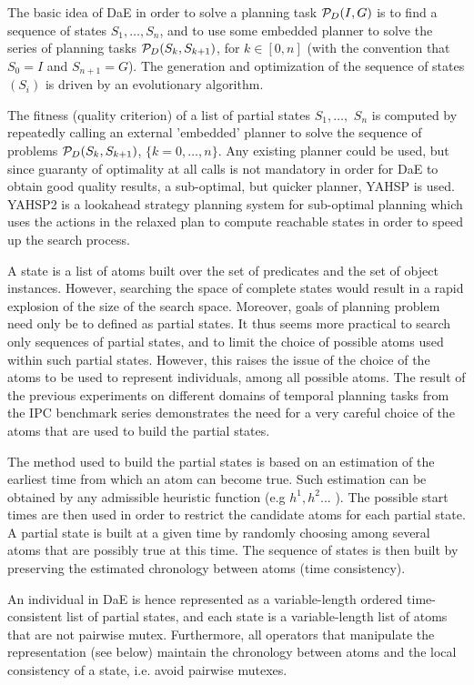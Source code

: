 \documentclass{acm_proc_article-sp}
\begin{document}
The basic idea of DaE in order to solve a planning task ${\cal P}_D(I,G)$ is to find a sequence of states $S_1, \ldots, S_n$, and to use some embedded planner to solve the series of planning tasks ${\cal P}_D(S_{k},S_{k+1})$, for $k \in [0,n]$ (with the convention that $S_0 = I$ and $S_{n+1} = G$). The generation and optimization of the sequence of states $(S_i)$ is driven by an evolutionary algorithm. 

The fitness (quality criterion) of a list of partial states $S_1, \ldots,$ $S_n$ is computed by repeatedly calling an external 'embedded' planner to solve the sequence of problems ${\cal P}_D(S_{k},S_{k+1})$, $\{k=0,\ldots,n\}$. Any existing planner could be used, but since guaranty of optimality at all calls is not mandatory in order for DaE to obtain good quality results, a sub-optimal, but quicker planner, YAHSP is used. YAHSP2 \cite{V:icaps04} is a lookahead strategy planning system for sub-optimal planning which uses the  actions in the relaxed plan to compute reachable states in order to speed up the search process. 

A state is a list of atoms built over the set of predicates and the set of object instances. However, searching the space of complete states would result in a rapid explosion of the size of the search space. Moreover, goals of planning problem need only be to defined as partial states. It thus seems more practical to search only sequences of partial states, and to limit the choice of possible atoms used within such partial states. However, this raises the issue of the choice of the atoms to be used to represent individuals, among all possible atoms. The result of the previous experiments on different domains of temporal planning tasks from the IPC benchmark series \cite{BibEvoCop2009} demonstrates the need for a very careful choice of the atoms that are used to build the partial states. 

The method used to build the partial states is based on an estimation of the earliest time from which an atom can become true. Such estimation can be obtained by any admissible heuristic function (e.g $h^1,h^2...$ \cite{HaslumGeffner-AIPS-2000}). The possible start times are then used in order to restrict the candidate atoms for each partial state. A partial state is built at a given time by randomly choosing among several atoms that are possibly true at this time. The sequence of states is then built by preserving the estimated chronology between atoms (time consistency).

An individual in DaE is hence represented as a variable-length ordered time-consistent list of partial states, and each state is a variable-length list of atoms that are not pairwise mutex. Furthermore, all operators that manipulate the representation (see below) maintain the chronology between atoms and the local consistency of a state, i.e. avoid pairwise mutexes.
\end{document}
